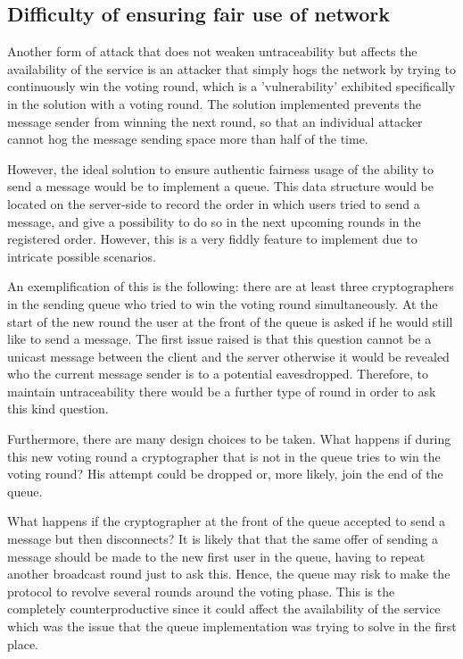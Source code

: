 \subsection{Difficulty of ensuring fair use of network}
Another form of attack that does not weaken untraceability but affects the availability of the service is an attacker that simply hogs the network by trying to continuously win the voting round, which is a 'vulnerability' exhibited specifically in the solution with a voting round. The solution implemented prevents the message sender from winning the next round, so that an individual attacker cannot hog the message sending space more than half of the time. 

However, the ideal solution to ensure authentic fairness usage of the ability to send a message would be to implement a queue. This data structure would be located on the server-side to record the order in which users tried to send a message, and give a possibility to do so in the next upcoming rounds in the registered order. However, this is a very fiddly feature to implement due to intricate possible scenarios. 

An exemplification of this is the following: there are at least three cryptographers in the sending queue who tried to win the voting round simultaneously. At the start of the new round the user at the front of the queue is asked if he would still like to send a message. The first issue raised is that this question cannot be a unicast message between the client and the server otherwise it would be revealed who the current message sender is to a potential eavesdropped. Therefore, to maintain untraceability there would be a further type of round in order to ask this kind question. 

Furthermore, there are many design choices to be taken. What happens if during this new voting round a cryptographer that is not in the queue tries to win the voting round? His attempt could be dropped or, more likely, join the end of the queue.

What happens if the cryptographer at the front of the queue accepted to send a message but then disconnects? It is likely that that the same offer of sending a message should be made to the new first user in the queue, having to repeat another broadcast round just to ask this. Hence, the queue may risk to make the protocol to revolve several rounds around the voting phase. This is the completely counterproductive since it could affect the availability of the service which was the issue that the queue implementation was trying to solve in the first place. 

